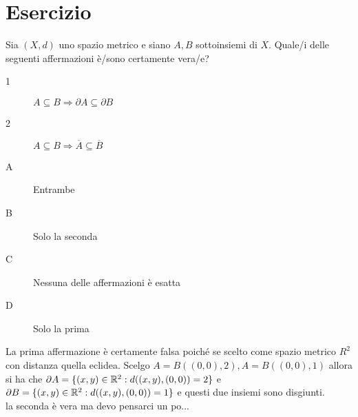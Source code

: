\section{Esercizio}
Sia $(X,d)$ uno spazio metrico e siano $A, B$ sottoinsiemi di $X$. Quale/i delle seguenti affermazioni è/sono certamente vera/e?
\begin{description}
	\item[1] $A\subseteq B\Rightarrow\partial A\subseteq \partial B$
	\item[2] $A\subseteq B\Rightarrow\overline{A}\subseteq\overline{B}$
\end{description}
\begin{description}
	\item[A] Entrambe
	\item[B] Solo la seconda
	\item[C] Nessuna delle affermazioni è esatta
	\item[D] Solo la prima
\end{description}
La prima affermazione è certamente falsa poiché se scelto come spazio metrico $R^2$ con distanza quella eclidea. Scelgo $A=B((0,0),2), A=B((0,0),1)$ allora si ha che $\partial A = \{(x,y)\in \mathbb{R}^2:d((x,y),(0,0))=2\}$ e $\partial B = \{(x,y)\in \mathbb{R}^2:d((x,y),(0,0))=1\}$ e questi due insiemi sono disgiunti.\\
la seconda è vera ma devo pensarci un po...\\
 


